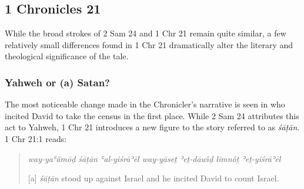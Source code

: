  \hypertarget{chronicles-21}{%
 \subsection{1 Chronicles 21}\label{chronicles-21}} 

 While the broad strokes of 2 Sam 24 and 1 Chr 21 remain quite similar, a few relatively small differences found in 1 Chr 21 dramatically alter the literary and theological significance of the tale. 

 \hypertarget{yahweh-or-a-satan}{%
 \subsubsection{Yahweh or (a) Satan?}\label{yahweh-or-a-satan}} 

 The most noticeable change made in the Chronicler's narrative is seen in who incited David to take the census in the first place. While 2 Sam 24 attributes this act to Yahweh, 1 Chr 21 introduces a new figure to the story referred to as \emph{śāṭān}. 1 Chr 21:1 reads: 

 \begin{quote} \emph{way-yaʿămōḏ śāṭān ʿal-yiśrāʾēl way-yāseṯ ʾeṯ-dāwı̂ḏ limnôṯ ʾeṯ-yiśrāʾēl} 

 {[}a{]} \emph{śāṭān} stood up against Israel and he incited David to count Israel. \end{quote} 

